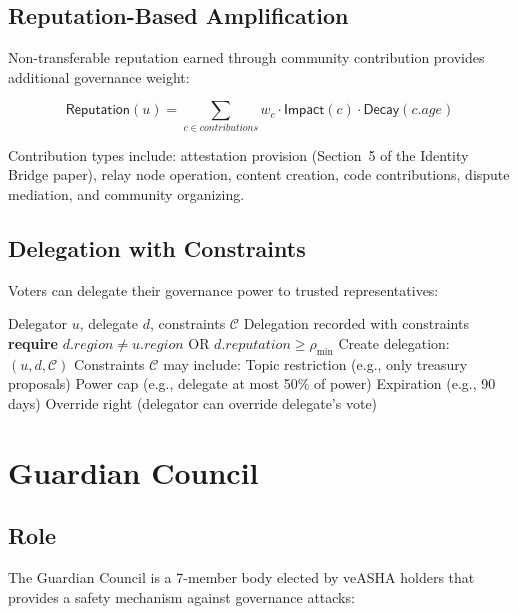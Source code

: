 \documentclass[11pt,a4paper]{article}
\begin{document}
\subsection{Reputation-Based Amplification}

Non-transferable reputation earned through community contribution provides additional governance weight:

\begin{equation}
    \mathsf{Reputation}(u) = \sum_{c \in \mathit{contributions}} w_c \cdot \mathsf{Impact}(c) \cdot \mathsf{Decay}(c.\mathit{age})
\end{equation}

Contribution types include: attestation provision (Section~5 of the Identity Bridge paper), relay node operation, content creation, code contributions, dispute mediation, and community organizing.

\subsection{Delegation with Constraints}

Voters can delegate their governance power to trusted representatives:

\begin{algorithm}[H]
\caption{Constrained Delegation}
\label{alg:delegate}
\begin{algorithmic}[1]
\Require Delegator $u$, delegate $d$, constraints $\mathcal{C}$
\Ensure Delegation recorded with constraints
\State \textbf{require} $d.\mathit{region} \neq u.\mathit{region}$ OR $d.\mathit{reputation} \geq \rho_{\min}$
\State Create delegation: $(u, d, \mathcal{C})$
\State Constraints $\mathcal{C}$ may include:
\State \quad Topic restriction (e.g., only treasury proposals)
\State \quad Power cap (e.g., delegate at most 50\% of power)
\State \quad Expiration (e.g., 90 days)
\State \quad Override right (delegator can override delegate's vote)
\end{algorithmic}
\end{algorithm}

\section{Guardian Council}

\subsection{Role}

The Guardian Council is a 7-member body elected by veASHA holders that provides a safety mechanism against governance attacks:
\end{document}
